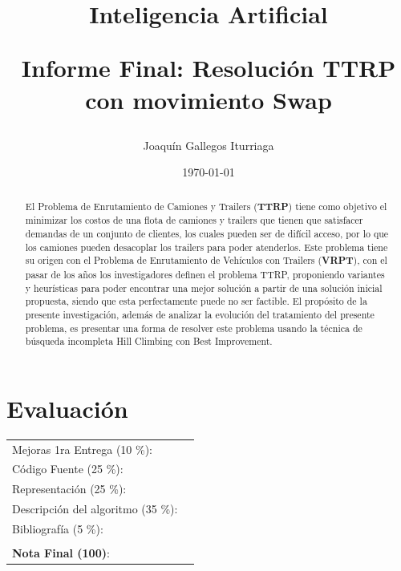 \documentclass[letter, 10pt]{article}
\begin{document}
\title{Inteligencia Artificial \\ \begin{Large}Informe Final: Resolución TTRP con movimiento Swap\end{Large}}
\author{Joaquín Gallegos Iturriaga}
\date{\today}
\maketitle


\section*{Evaluaci\'on}

\begin{tabular}{ll}
Mejoras 1ra Entrega (10 \%): &  \underline{\hspace{2cm}}\\
C\'odigo Fuente (25 \%): &  \underline{\hspace{2cm}}\\
Representaci\'on (25 \%):  & \underline{\hspace{2cm}} \\
Descripci\'on del algoritmo (35 \%):  & \underline{\hspace{2cm}} \\
Bibliograf\'ia (5 \%): & \underline{\hspace{2cm}}\\
 &  \\
\textbf{Nota Final (100)}:   & \underline{\hspace{2cm}}
\end{tabular}

\begin{abstract}
El Problema de Enrutamiento de Camiones y Trailers (\textbf{TTRP}) tiene como objetivo el minimizar los costos de una flota de camiones y trailers que tienen que satisfacer demandas de un conjunto de clientes, los cuales pueden ser de difícil acceso, por lo que los camiones pueden desacoplar los trailers para poder atenderlos. Este problema tiene su origen con el Problema de Enrutamiento de Vehículos con Trailers (\textbf{VRPT}), con el pasar de los años los investigadores definen el problema TTRP, proponiendo variantes y heurísticas para poder encontrar una mejor solución a partir de una solución inicial propuesta, siendo que esta perfectamente puede no ser factible.
El propósito de la presente investigación, además de analizar la evolución del tratamiento del presente problema, es presentar una forma de resolver este problema usando la técnica de búsqueda incompleta Hill Climbing con Best Improvement.
\end{abstract}
\end{document}
